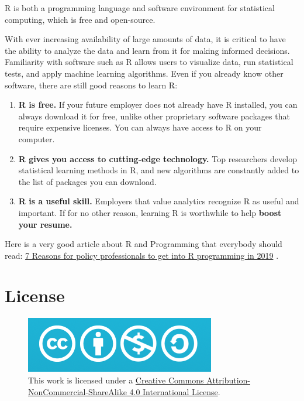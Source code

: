 \documentclass[
]{book}
\theoremstyle{definition}
\theoremstyle{definition}
\theoremstyle{definition}
\theoremstyle{definition}
\theoremstyle{remark}
\begin{document}
R is both a programming language and software environment for statistical computing, which is free and open-source.

With ever increasing availability of large amounts of data, it is critical to have the ability to analyze the data and learn from it for making informed decisions. Familiarity with software such as R allows users to visualize data, run statistical tests, and apply machine learning algorithms. Even if you already know other software, there are still good reasons to learn R:

\begin{enumerate}
\def\labelenumi{\arabic{enumi}.}
\item
  \textbf{R is free.} If your future employer does not already have R installed, you can always download it for free, unlike other proprietary software packages that require expensive licenses. You can always have access to R on your computer.
\item
  \textbf{R gives you access to cutting-edge technology.} Top researchers develop statistical learning methods in R, and new algorithms are constantly added to the list of packages you can download.
\item
  \textbf{R is a useful skill.} Employers that value analytics recognize R as useful and important. If for no other reason, learning R is worthwhile to help \textbf{boost your resume.}
\end{enumerate}

Here is a very good article about R and Programming that everybody should read: \href{http://gilesd-j.com/2019/01/07/7-reasons-for-policy-professionals-to-get-pumped-about-r-programming-in-2019/}{7 Reasons for policy professionals to get into R programming in 2019} \citep{Jones_2019}.

\hypertarget{license}{%
\section*{License}\label{license}}

\begin{figure}
\centering
\includegraphics{png/cc.png}
\caption{This work is licensed under a \href{http://creativecommons.org/licenses/by-nc-sa/4.0/}{Creative Commons Attribution-NonCommercial-ShareAlike 4.0 International License}.}
\end{figure}
\end{document}
